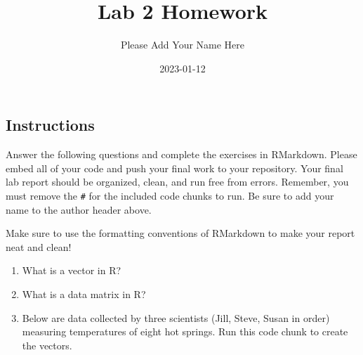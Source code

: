 \documentclass[
]{article}
\title{Lab 2 Homework}
\author{Please Add Your Name Here}
\date{2023-01-12}
\begin{document}
\maketitle

\hypertarget{instructions}{%
\subsection{Instructions}\label{instructions}}

Answer the following questions and complete the exercises in RMarkdown.
Please embed all of your code and push your final work to your
repository. Your final lab report should be organized, clean, and run
free from errors. Remember, you must remove the \texttt{\#} for the
included code chunks to run. Be sure to add your name to the author
header above.

Make sure to use the formatting conventions of RMarkdown to make your
report neat and clean!

\begin{enumerate}
\def\labelenumi{\arabic{enumi}.}
\item
  What is a vector in R?
\item
  What is a data matrix in R?
\item
  Below are data collected by three scientists (Jill, Steve, Susan in
  order) measuring temperatures of eight hot springs. Run this code
  chunk to create the vectors.
\end{enumerate}
\end{document}
